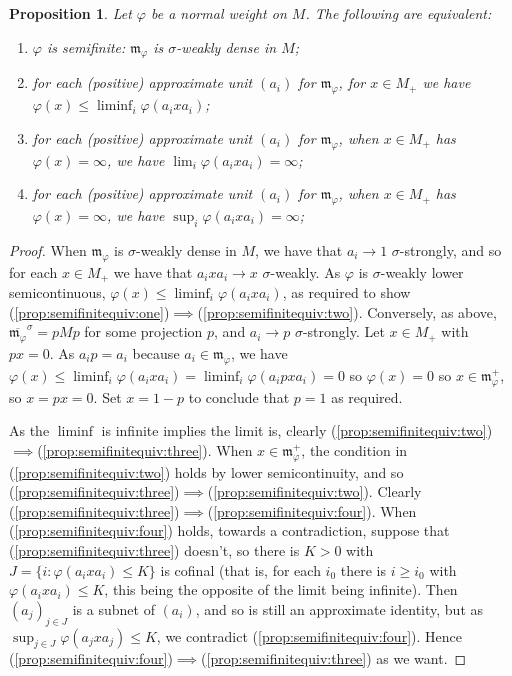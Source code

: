 \documentclass[a4paper,11pt]{article}
\theoremstyle{plain}
\newtheorem{proposition}{Proposition}[section]
\theoremstyle{remark}
\newcommand{\mf}[1]{\mathfrak{#1}}
\begin{document}
\begin{proposition}\label{prop:semifinitequiv}
Let $\varphi$ be a normal weight on $M$.  The following are equivalent:
\begin{enumerate}
  \item\label{prop:semifinitequiv:one} $\varphi$ is semifinite: $\mf m_\varphi$ is $\sigma$-weakly dense in $M$;
  \item\label{prop:semifinitequiv:two} for each (positive) approximate unit $(a_i)$ for $\mf m_\varphi$, for $x\in M_+$ we have $\varphi(x) \leq \liminf_i \varphi(a_i x a_i)$;
  \item\label{prop:semifinitequiv:three} for each (positive) approximate unit $(a_i)$ for $\mf m_\varphi$, when $x\in M_+$ has $\varphi(x)=\infty$, we have $\lim_i \varphi(a_i x a_i) = \infty$;
  \item\label{prop:semifinitequiv:four} for each (positive) approximate unit $(a_i)$ for $\mf m_\varphi$, when $x\in M_+$ has $\varphi(x)=\infty$, we have $\sup_i \varphi(a_i x a_i) = \infty$;
\end{enumerate}
\end{proposition}
\begin{proof}
When $\mf m_\varphi$ is $\sigma$-weakly dense in $M$, we have that $a_i \to 1$ $\sigma$-strongly, and so for each $x\in M_+$ we have that $a_i x a_i \to x$ $\sigma$-weakly.  As $\varphi$ is $\sigma$-weakly lower semicontinuous, $\varphi(x) \leq \liminf_i \varphi(a_ixa_i)$, as required to show (\ref{prop:semifinitequiv:one})$\implies$(\ref{prop:semifinitequiv:two}).
Conversely, as above, $\overline{\mf m_\varphi}^\sigma = pMp$ for some projection $p$, and $a_i \to p$ $\sigma$-strongly.  Let $x\in M_+$ with $px=0$.  As $a_i p = a_i$ because $a_i\in\mf m_\varphi$, we have $\varphi(x) \leq \liminf_i \varphi(a_ixa_i) = \liminf_i \varphi(a_ipxa_i) = 0$ so $\varphi(x)=0$ so $x\in\mf m_\varphi^+$, so $x = px = 0$.  Set $x=1-p$ to conclude that $p=1$ as required.

As the $\liminf$ is infinite implies the limit is, clearly (\ref{prop:semifinitequiv:two})$\implies$(\ref{prop:semifinitequiv:three}).  When $x\in\mf m_\varphi^+$, the condition in (\ref{prop:semifinitequiv:two}) holds by lower semicontinuity, and so (\ref{prop:semifinitequiv:three})$\implies$(\ref{prop:semifinitequiv:two}).  Clearly (\ref{prop:semifinitequiv:three})$\implies$(\ref{prop:semifinitequiv:four}).  When (\ref{prop:semifinitequiv:four}) holds, towards a contradiction, suppose that (\ref{prop:semifinitequiv:three}) doesn't, so there is $K>0$ with $J = \{ i : \varphi(a_ixa_i) \leq K \}$ is cofinal (that is, for each $i_0$ there is $i\geq i_0$ with $\varphi(a_ixa_i) \leq K$, this being the opposite of the limit being infinite).  Then $(a_j)_{j\in J}$ is a subnet of $(a_i)$, and so is still an approximate identity, but as $\sup_{j\in J} \varphi(a_jxa_j) \leq K$, we contradict (\ref{prop:semifinitequiv:four}).  Hence (\ref{prop:semifinitequiv:four})$\implies$(\ref{prop:semifinitequiv:three}) as we want.
\end{proof}
\end{document}
